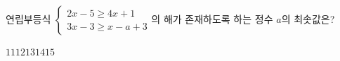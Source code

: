 연립부등식 $\begin{cases} 2x-5\ge 4x+1 \\ 3x-3\ge x-a+3 \end{cases}$의 해가 존재하도록 하는 정수 $a$의 최솟값은?
\begin{choices32}{$11$}{$12$}{$13$}{$14$}{$15$}\end{choices32}
